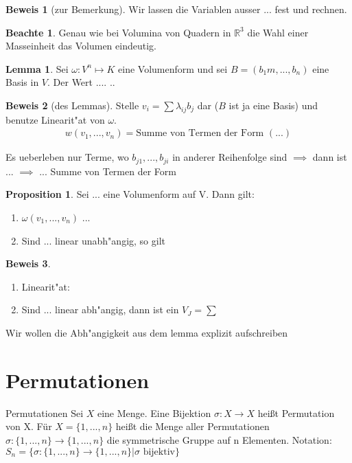 \documentclass[fontsize=11pt,paper=a4,BCOR=0mm,DIV=11,automark,headsepline]{scrbook}
\theoremstyle{remark}
\theoremstyle{definition}
\newtheorem*{notte}{Beachte}
\newtheorem*{proposition}{Proposition}
\newtheorem{lemma}{Lemma}[section]
\theoremstyle{proof}
\newtheorem*{prof}{Beweis}
\theoremstyle{remark}
\begin{document}
\begin{prof}[zur Bemerkung]
  Wir lassen die Variablen ausser ... fest und rechnen.
\end{prof}

\begin{notte}
  Genau wie bei Volumina von Quadern in $\mathbb{R}^3$ die Wahl einer
  Masseinheit das Volumen eindeutig.
\end{notte}

\begin{lemma}
  Sei $\omega: V^n\mapsto K$ eine Volumenform und sei $B=(b_1m, ... , b_n)$
  eine Basis in $V$. Der Wert ....  ..
\end{lemma}

\begin{prof}[des Lemmas]
  Stelle $v_i=\sum{\lambda_{ij}b_j}$ dar ($B$ ist ja eine Basis) und benutze
  Linearit"at von $\omega$.
  \begin{align*}
    w(v_1, ..., v_n)=\text{Summe von Termen der Form } (...)
  \end{align*}

  Es ueberleben nur Terme, wo $b_{j1},...,b_{ji}$ in anderer Reihenfolge sind
  $\implies$ dann ist ... $\implies$ ... Summe von Termen der Form
\end{prof}
\begin{proposition}
  Sei ... eine Volumenform auf V. Dann gilt:
  \begin{enumerate}
  \item $\omega(v_1,...,v_n)$ ...
  \item Sind ... linear unabh"angig, so gilt
  \end{enumerate}
\end{proposition}

\begin{prof}
  \begin{enumerate}
  \item Linearit"at: 
  \item Sind ... linear abh"angig, dann ist ein $V_J=\sum$
  \end{enumerate}
\end{prof}

Wir wollen die Abh"angigkeit aus dem lemma explizit aufschreiben

\section{Permutationen}
\label{sec:perm}

\begin{definition}{Permutationen}{}
  Sei $X$ eine Menge. Eine Bijektion $\sigma: X \to X$ heißt Permutation
  von X. \newline
  Für \(X = \{1,...,n\}\) heißt die Menge aller Permutationen \(\sigma: \{1,...,n\}\to\{1,...,n\}\) die symmetrische Gruppe auf n Elementen. Notation: \(S_n = \{ \sigma: \{1,...,n\}\to\{1,...,n\}|\sigma\text{ bijektiv}\}\)
\end{definition}
\end{document}
